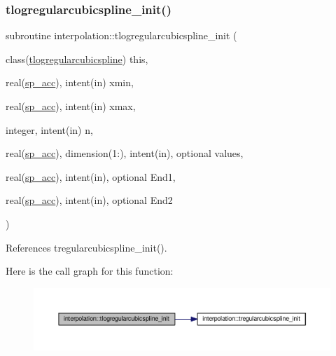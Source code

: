 \subsubsection{\texorpdfstring{tlogregularcubicspline\+\_\+init()}{tlogregularcubicspline\_init()}}
{\footnotesize\ttfamily subroutine interpolation\+::tlogregularcubicspline\+\_\+init (\begin{DoxyParamCaption}\item[{class(\mbox{\hyperlink{structinterpolation_1_1tlogregularcubicspline}{tlogregularcubicspline}})}]{this,  }\item[{real(\mbox{\hyperlink{namespaceinterpolation_af72aa9a05feb8ef90b2d26e4a013abf3}{sp\+\_\+acc}}), intent(in)}]{xmin,  }\item[{real(\mbox{\hyperlink{namespaceinterpolation_af72aa9a05feb8ef90b2d26e4a013abf3}{sp\+\_\+acc}}), intent(in)}]{xmax,  }\item[{integer, intent(in)}]{n,  }\item[{real(\mbox{\hyperlink{namespaceinterpolation_af72aa9a05feb8ef90b2d26e4a013abf3}{sp\+\_\+acc}}), dimension(1\+:), intent(in), optional}]{values,  }\item[{real(\mbox{\hyperlink{namespaceinterpolation_af72aa9a05feb8ef90b2d26e4a013abf3}{sp\+\_\+acc}}), intent(in), optional}]{End1,  }\item[{real(\mbox{\hyperlink{namespaceinterpolation_af72aa9a05feb8ef90b2d26e4a013abf3}{sp\+\_\+acc}}), intent(in), optional}]{End2 }\end{DoxyParamCaption})}



References tregularcubicspline\+\_\+init().

Here is the call graph for this function\+:
\nopagebreak
\begin{figure}[H]
\begin{center}
\leavevmode
\includegraphics[width=350pt]{namespaceinterpolation_aa2be88d51742c20455f21df95d3cb51d_cgraph}
\end{center}
\end{figure}
\mbox{\label{namespaceinterpolation_a7268d0f57d8b03233c2f2b56ac6fdc52}} 
